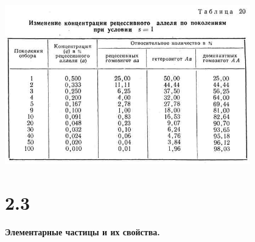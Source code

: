 \documentclass[a4paper,14pt]{article}
\begin{document}
\begin{center}
	\includegraphics[width=0.80\textwidth]{img/1_7_0.png}
\end{center}
\section*{2.3}
\begin{center}
	\LARGE{\textbf{Элементарные частицы и их свойства.}}\\
\end{center}
\end{document}
